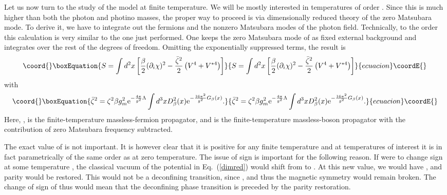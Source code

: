 \documentclass[a4paper,12pt]{article}
\begin{document}
Let us now turn to the study of the model at finite temperature.
We will be mostly interested in temperatures of order \coordHE{}. Since
this is much higher than both the photon and photino masses, the
proper way to proceed is via dimensionally reduced theory of the
zero Matsubara mode. To derive it, we have to integrate out the
fermions and the nonzero Matsubara modes of the photon field.
Technically, to the order \coordHE{} this calculation
is very similar to the one just performed. One keeps the zero
Matsubara mode of \myHighlight{$\chi$}\coordHE{} as fixed external background and
integrates over the rest of the degrees of freedom. Omitting the
exponentially suppressed terms, the result is
\begin{equation}\coord{}\boxEquation{
S=  \int d^2x\left[\frac\beta2(\partial_i\chi)^2- {\bar\zeta
^2\over 2}\left(V^4+V^{*4}\right)\right]\label{dimred}}{
S=  \int d^2x\left[\frac\beta2(\partial_i\chi)^2- {\bar\zeta
^2\over 2}\left(V^4+V^{*4}\right)\right]}{ecuacion}\coordE{}\end{equation} with
\begin{equation}\coord{}\boxEquation{
\bar\zeta^2= \zeta^2\beta g_m^2 {\rm e}^{-{4\pi\over
g^2}\Lambda}\int d^3x D_\beta^2(x){\rm e}^{-{16\pi^2\over g^2}
G_\beta(x)}.
}{
\bar\zeta^2= \zeta^2\beta g_m^2 {\rm e}^{-{4\pi\over
g^2}\Lambda}\int d^3x D_\beta^2(x){\rm e}^{-{16\pi^2\over g^2}
G_\beta(x)}.
}{ecuacion}\coordE{}\end{equation} Here, \coordHE{}, \coordHE{} is the finite-temperature
massless-fermion propagator, and \coordHE{} is the finite-temperature
massless-boson propagator with the contribution of
zero Matsubara frequency subtracted.

The exact value of \myHighlight{$\bar\zeta$}\coordHE{} is not important. It is however
clear that it is positive for any finite temperature and at
temperatures of interest it is in fact parametrically of the same
order as at zero temperature. The issue of sign is important for
the following reason. If \coordHE{} were to change sign at some
temperature \coordHE{}, the classical vacuum of the potential in
Eq.~(\ref{dimred}) would shift from \coordHE{} to
\coordHE{}. At this new value, we
would have \coordHE{}, and parity would be
restored. This would not be a deconfining transition, since
\coordHE{}, and thus the magnetic \coordHE{} symmetry would remain
broken. The change of sign of \coordHE{} thus would mean that
the deconfining phase transition is preceded by the parity
restoration.
\end{document}
